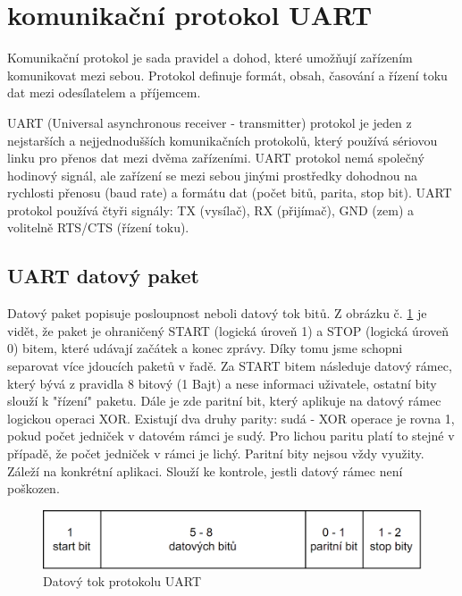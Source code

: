 \section{komunikační protokol UART}
\label{UART protokol}
Komunikační protokol je sada pravidel a dohod, které umožňují zařízením komunikovat mezi sebou. Protokol definuje formát, obsah, časování a řízení toku dat mezi odesílatelem a příjemcem.

UART (Universal asynchronous receiver - transmitter) protokol je jeden z nejstarších a nejjednodušších komunikačních protokolů, který používá sériovou linku pro přenos dat mezi dvěma zařízeními. UART protokol nemá společný hodinový signál, ale zařízení se mezi sebou jinými prostředky dohodnou na rychlosti přenosu (baud rate) a formátu dat (počet bitů, parita, stop bit). UART protokol používá čtyři signály: TX (vysílač), RX (přijímač), GND (zem) a volitelně RTS/CTS (řízení toku). \cite{ser kom} %

\subsection{UART datový paket}
\label{UARTt}
Datový paket popisuje posloupnost neboli datový tok bitů. Z obrázku č. \ref{UART packet} je vidět, že paket je ohraničený START (logická úroveň 1) a STOP (logická úroveň 0) bitem, které udávají začátek a konec zprávy. Díky tomu jsme schopni separovat více jdoucích paketů v řadě. Za START bitem následuje datový rámec, který bývá z pravidla 8 bitový (1 Bajt) a nese informaci uživatele, ostatní bity slouží k "řízení" paketu. Dále je zde paritní bit, který aplikuje na datový rámec logickou operaci XOR. Existují dva druhy parity: sudá - XOR operace je rovna 1, pokud počet jedniček v datovém rámci je sudý.  Pro lichou paritu platí to stejné v případě, že počet jedniček v rámci je lichý. Paritní bity nejsou vždy využity. Záleží na konkrétní aplikaci. Slouží ke kontrole, jestli datový rámec není poškozen. \cite{ser kom} %

\begin{figure}[!h]
    \begin{center}
        \includegraphics[scale=0.5]{obrazky/datovy ramec UART - final.png}
    \end{center}
    \caption{Datový tok protokolu UART}
    \label{UART packet}
\end{figure}

